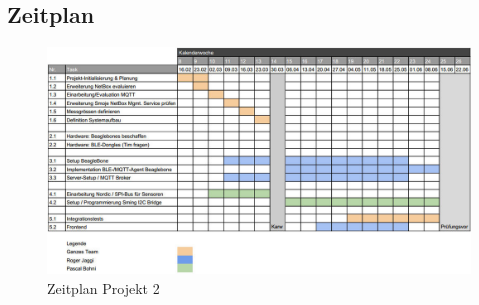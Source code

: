 \begin{landscape}
	
\chapter{Zeitplan}
\label{chap:zeitplan}

\begin{figure}[hbtp]
	\center
	\includegraphics[scale=0.8]{bilder/zeitplan.jpg}
	\caption{Zeitplan Projekt 2}
	\label{fig:zeitplan}
\end{figure}


\end{landscape}
